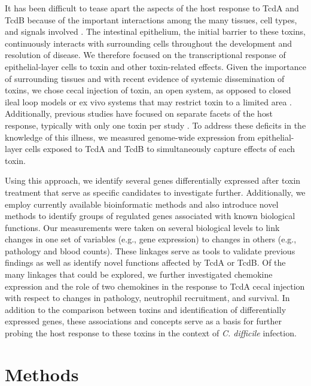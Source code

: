 It has been difficult to tease apart the aspects of the host response to TcdA and TcdB because of the important interactions among the many tissues, cell types, and signals involved \cite{Sun:2010kt,Madan:2012kp}. The intestinal epithelium, the initial barrier to these toxins, continuously interacts with surrounding cells throughout the development and resolution of disease. We therefore focused on the transcriptional response of epithelial-layer cells to toxin and other toxin-related effects. Given the importance of surrounding tissues and with recent evidence of systemic dissemination of toxins, we chose cecal injection of toxin, an open system, as opposed to closed ileal loop models or ex vivo systems that may restrict toxin to a limited area \cite{Steele:2012ft}. Additionally, previous studies have focused on separate facets of the host response, typically with only one toxin per study \cite{Morteau:2002ts,Kelly:1994cu,Kokkotou:2009ik,Ishida:2004ta,Castagliuolo:1998um,Warny:2000ct,Alcantara:2005dt}. To address these deficits in the knowledge of this illness, we measured genome-wide expression from epithelial-layer cells exposed to TcdA and TcdB to simultaneously capture effects of each toxin.

Using this approach, we identify several genes differentially expressed after toxin treatment that serve as specific candidates to investigate further. Additionally, we employ currently available bioinformatic methods and also introduce novel methods to identify groups of regulated genes associated with known biological functions. Our measurements were taken on several biological levels to link changes in one set of variables (e.g., gene expression) to changes in others (e.g., pathology and blood counts). These linkages serve as tools to validate previous findings as well as identify novel functions affected by TcdA or TcdB. Of the many linkages that could be explored, we further investigated chemokine expression and the role of two chemokines in the response to TcdA cecal injection with respect to changes in pathology, neutrophil recruitment, and survival. In addition to the comparison between toxins and identification of differentially expressed genes, these associations and concepts serve as a basis for further probing the host response to these toxins in the context of \textit{C. difficile} infection.

\section{Methods}


